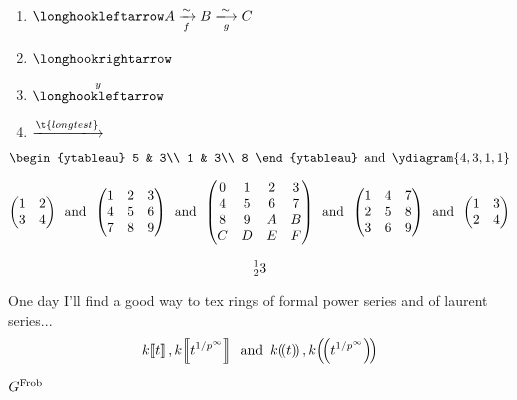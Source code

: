\documentclass{article}
\numberwithin{thm}{section}
\numberwithin{prob}{section}
\numberwithin{equation}{section}
\begin{document}
\begin{enumerate}
    \item  $\fintoo A\xiso fB\xisoo gC$
    \item  $\intoo$
    \item $\xfintoo{y}$
    \item $\xlongrightarrow{\t{long test}}$
\end{enumerate}
$$\begin{ytableau}
    5 & 3\\
    1 & 3\\
    8
\end{ytableau}\tand\ydiagram{4,3,1,1}$$

$$\mat1234\tand\Mat123456789\tand\MAT0123456789ABCDEF\tand\Matt123456789\tand\matt1234$$

$$\prescript123$$

One day I'll find a good way to tex rings of formal power series and of laurent series...
$$k\dsq t,k\dsq{t^{1/p^\infty}}\tand k\dparens t,k\dparens{t^{1/p^\infty}}$$

$G^\Frob$
\end{document}
